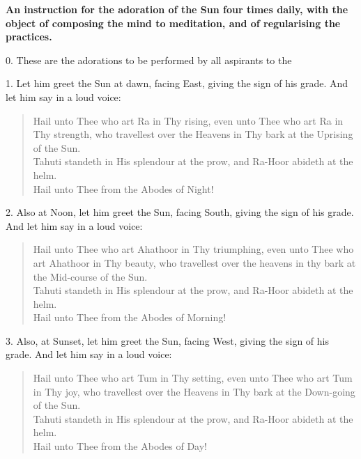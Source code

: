 \label{resh}

\textbf{An instruction for the adoration of the Sun four times daily, with the object of composing the mind to meditation, and of regularising the practices.}

0. These are the adorations to be performed by all aspirants to the \Argentium{}

1. Let him greet the Sun at dawn, facing East, giving the sign of his grade. And let him say in a loud voice:

\begin{verse}
Hail unto Thee who art Ra in Thy rising, even unto Thee who art Ra in Thy strength, who travellest over the Heavens in Thy bark at the Uprising of the Sun.  \\
Tahuti standeth in His splendour at the prow, and Ra-Hoor abideth at the helm. \\
Hail unto Thee from the Abodes of Night!
\end{verse}

2. Also at Noon, let him greet the Sun, facing South, giving the sign of his grade. And let him say in a loud voice:

\begin{verse}
Hail unto Thee who art Ahathoor in Thy triumphing, even unto Thee who art Ahathoor in Thy beauty, who travellest over the heavens in thy bark at the Mid-course of the Sun. \\
Tahuti standeth in His splendour at the prow, and Ra-Hoor abideth at the helm. \\
Hail unto Thee from the Abodes of Morning!
\end{verse}

3. Also, at Sunset, let him greet the Sun, facing West, giving the sign of his grade. And let him say in a loud voice:
\begin{verse}
Hail unto Thee who art Tum in Thy setting, even unto Thee who art Tum in Thy joy, who travellest over the Heavens in Thy bark at the Down-going of the Sun. \\
Tahuti standeth in His splendour at the prow, and Ra-Hoor abideth at the helm. \\
Hail unto Thee from the Abodes of Day!
\end{verse}

